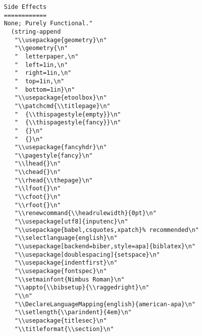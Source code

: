 \documentclass[11pt]{article}
\begin{document}
\begin{enumerate}
\begin{verbatim}
Side Effects
============
None; Purely Functional."
  (string-append
   "\\usepackage{geometry}\n"
   "\\geometry{\n"
   "  letterpaper,\n"
   "  left=1in,\n"
   "  right=1in,\n"
   "  top=1in,\n"
   "  bottom=1in}\n"
   "\\usepackage{etoolbox}\n"
   "\\patchcmd{\\titlepage}\n"
   "  {\\thispagestyle{empty}}\n"
   "  {\\thispagestyle{fancy}}\n"
   "  {}\n"
   "  {}\n"
   "\\usepackage{fancyhdr}\n"
   "\\pagestyle{fancy}\n"
   "\\lhead{}\n"
   "\\chead{}\n"
   "\\rhead{\\thepage}\n"
   "\\lfoot{}\n"
   "\\cfoot{}\n"
   "\\rfoot{}\n"
   "\\renewcommand{\\headrulewidth}{0pt}\n"
   "\\usepackage[utf8]{inputenc}\n"
   "\\usepackage{babel,csquotes,xpatch}% recommended\n"
   "\\selectlanguage{english}\n"
   "\\usepackage[backend=biber,style=apa]{biblatex}\n"
   "\\usepackage[doublespacing]{setspace}\n"
   "\\usepackage{indentfirst}\n"
   "\\usepackage{fontspec}\n"
   "\\setmainfont{Nimbus Roman}\n"
   "\\appto{\\bibsetup}{\\raggedright}\n"
   "\\n"
   "\\DeclareLanguageMapping{english}{american-apa}\n"
   "\\setlength{\\parindent}{4em}\n"
   "\\usepackage{titlesec}\n"
   "\\titleformat{\\section}\n"

\end{verbatim}
\end{enumerate}
\end{document}

